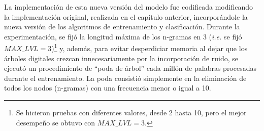 La implementación de esta nueva versión del modelo fue codificada modificando la implementación original, realizada en el capítulo anterior, incorporándole la nueva versión de los algoritmos de entrenamiento y clasificación.
Durante la experimentación, se fijó la longitud máxima de los n-gramas en $3$ (\emph{i.e.} se fijó $MAX\_LVL = 3$)\footnote{Se hicieron pruebas con diferentes valores, desde 2 hasta 10, pero el mejor desempeño se obtuvo con $MAX\_LVL = 3$.}
y, además, para evitar desperdiciar memoria al dejar que los árboles digitales crezcan innecesariamente por la incorporación de ruido, se ejecutó un procedimiento de ``poda de árbol'' cada millón de palabras procesadas durante el entrenamiento. La poda consistió simplemente en la eliminación de todos los nodos (n-gramas) con una frecuencia menor o igual a 10.

